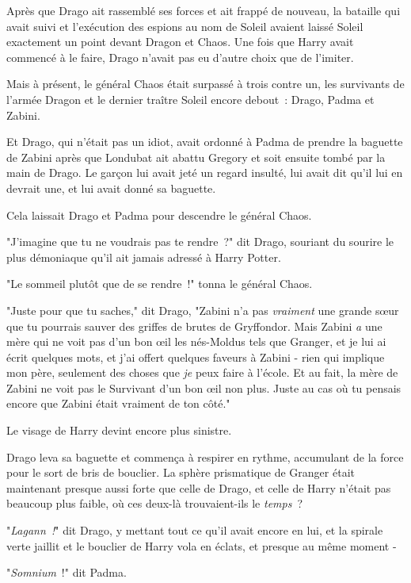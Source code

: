 Après que Drago ait rassemblé ses forces et ait frappé de nouveau, la bataille qui avait suivi et l'exécution des espions au nom de Soleil avaient laissé Soleil exactement un point devant Dragon et Chaos. Une fois que Harry avait commencé à le faire, Drago n'avait pas eu d'autre choix que de l'imiter.

Mais à présent, le général Chaos était surpassé à trois contre un, les survivants de l'armée Dragon et le dernier traître Soleil encore debout~: Drago, Padma et Zabini.

Et Drago, qui n'était pas un idiot, avait ordonné à Padma de prendre la baguette de Zabini après que Londubat ait abattu Gregory et soit ensuite tombé par la main de Drago. Le garçon lui avait jeté un regard insulté, lui avait dit qu'il lui en devrait une, et lui avait donné sa baguette.

Cela laissait Drago et Padma pour descendre le général Chaos.

"J'imagine que tu ne voudrais pas te rendre~?" dit Drago, souriant du sourire le plus démoniaque qu'il ait jamais adressé à Harry Potter.

"Le sommeil plutôt que de se rendre~!" tonna le général Chaos.

"Juste pour que tu saches," dit Drago, "Zabini n'a pas \emph{vraiment} une grande sœur que tu pourrais sauver des griffes de brutes de Gryffondor. Mais Zabini \emph{a} une mère qui ne voit pas d'un bon œil les nés-Moldus tels que Granger, et je lui ai écrit quelques mots, et j'ai offert quelques faveurs à Zabini - rien qui implique mon père, seulement des choses que \emph{je} peux faire à l'école. Et au fait, la mère de Zabini ne voit pas le Survivant d'un bon œil non plus. Juste au cas où tu pensais encore que Zabini était vraiment de ton côté."

Le visage de Harry devint encore plus sinistre.

Drago leva sa baguette et commença à respirer en rythme, accumulant de la force pour le sort de bris de bouclier. La sphère prismatique de Granger était maintenant presque aussi forte que celle de Drago, et celle de Harry n'était pas beaucoup plus faible, où ces deux-là trouvaient-ils le \emph{temps}~?

"\emph{Lagann~!}" dit Drago, y mettant tout ce qu'il avait encore en lui, et la spirale verte jaillit et le bouclier de Harry vola en éclats, et presque au même moment -

"\emph{Somnium}~!" dit Padma.

\later

